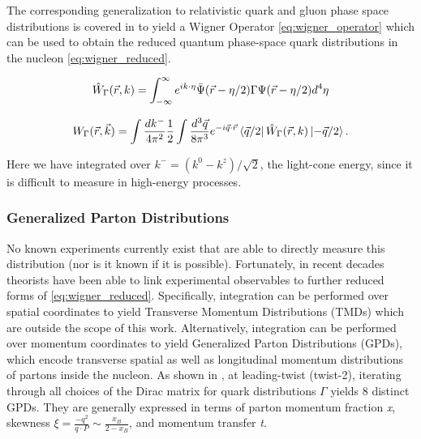         

            The corresponding generalization to relativistic quark and gluon phase space distributions is covered in \parencite{Ji2004GENERALIZEDDISTRIBUTIONS} to yield a Wigner Operator \eqref{eq:wigner_operator} which can be used to obtain the reduced quantum phase-space quark distributions in the nucleon \eqref{eq:wigner_reduced}. 

            \begin{equation}\label{eq:wigner_operator}
                \hat{W}_{\Gamma}(\Vec{r},k) = \int_{-\infty}^{\infty} e^{ik\cdot\eta} \Bar{\Psi}(\Vec{r}-\eta/2) \Gamma \Psi(\Vec{r}-\eta/2)  d^4\eta
            \end{equation}

            \begin{equation}\label{eq:wigner_reduced}
                     W_{\Gamma}(\Vec{r},\Vec{k}) = \int \frac{dk^-}{4\pi^2} \frac{1}{2}   \int \frac{d^3\Vec{q}}{8\pi^3}  e^{-i\Vec{q}\cdot\Vec{r}} \bra{\Vec{q}/2} \hat{W}_{\Gamma}(\Vec{r},k)\ket{-\Vec{q}/2}.
            \end{equation}

            Here we have integrated over $k^- = (k^0-k^z)/\sqrt{2}$, the light-cone energy, since it is difficult to measure in high-energy processes. 
    
    
        \subsubsection*{Generalized Parton Distributions}\label{sec:ch1sec2GPDs}

            
            No known experiments currently exist that are able to directly measure this distribution (nor is it known if it is possible). Fortunately, in recent decades theorists have been able to link experimental observables to further reduced forms of \eqref{eq:wigner_reduced}. Specifically, integration can be performed over spatial coordinates to yield Transverse Momentum Distributions (TMDs) which are outside the scope of this work. Alternatively, integration can be performed over momentum coordinates to yield Generalized Parton Distributions (GPDs), which encode transverse spatial as well as longitudinal momentum distributions of partons inside the nucleon. As shown in \parencite{Ji2004GENERALIZEDDISTRIBUTIONS}, at leading-twist (twist-2), iterating through all choices of the Dirac matrix for quark distributions $\Gamma$ yields 8 distinct GPDs. They are generally expressed in terms of parton momentum fraction \textit{x}, skewness $\xi = \frac{-q^2}{q \cdot P} \sim \frac{x_B}{2-x_B}$, and momentum transfer \textit{t}.
            

